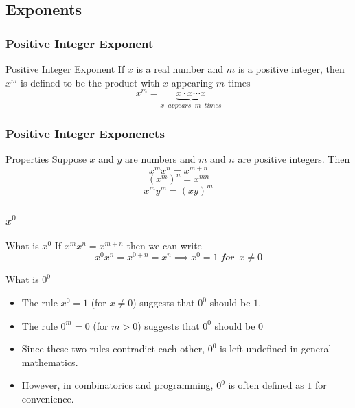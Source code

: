 \documentclass{beamer}
\begin{document}
\subsection{Exponents}
\begin{frame}
  \frametitle{Positive Integer Exponent}
  \begin{block}{Positive Integer Exponent}
    If \(x\) is a real number and \(m\) is a positive integer, then \(x^{m}\) is defined to be the
product with \(x\) appearing \(m\) times
\[x^{m} = \underset{x \;\;appears\;\;m \;\;times}{\underbrace{x \cdot x \cdots x }}\]
    
  \end{block}
\end{frame}

\begin{frame}
  \frametitle{Positive Integer Exponenets}
  \begin{block}{Properties}
    Suppose \(x\) and \(y\) are numbers and \(m\) and \(n\) are positive integers. Then 
    \[x^{m}x^{n} = x^{m+n} \]   
    \[\left(x^{m}\right)^{n} = x^{mn} \] 
    \[x^{m}y^{m} = \left(xy\right)^{m} \] 
  \end{block}
\end{frame}
\begin{frame}
  \frametitle{\(x^{0}\)} 
  \begin{alertblock}{What is \(x^{0}\)}
    If  \(x^{m}x^{n} = x^{m+n}\) then we can write \[x^{0}x^{n} = x^{0+n} = x^{n} \implies x^{0} = 1\;for\;\ x \neq 0\]
   \end{alertblock}

   \begin{alertblock}{What is \(0^{0}\)}
    \begin{itemize}
      \item The rule \( x^0 = 1 \) (for \( x \neq 0 \)) suggests that \( 0^0 \) should be \(1\).
      \item The rule \( 0^m = 0 \) (for \( m > 0 \)) suggests that \( 0^0 \) should be \(0\)
      \item Since these two rules contradict each other, \( 0^0 \) is left undefined in general mathematics.
      \item However, in combinatorics and programming, \( 0^0 \) is often defined as \(1\) for convenience.
  \end{itemize}
   \end{alertblock}
\end{frame}
\end{document}
